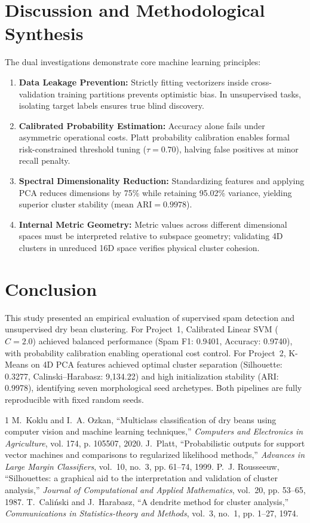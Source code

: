 \documentclass[9.5pt,twocolumn,letterpaper]{article}
\begin{document}
\section{Discussion and Methodological Synthesis}
The dual investigations demonstrate core machine learning principles:
\begin{enumerate}
  \item \textbf{Data Leakage Prevention:} Strictly fitting vectorizers inside cross-validation training partitions prevents optimistic bias. In unsupervised tasks, isolating target labels ensures true blind discovery.
  \item \textbf{Calibrated Probability Estimation:} Accuracy alone fails under asymmetric operational costs. Platt probability calibration enables formal risk-constrained threshold tuning ($\tau=0.70$), halving false positives at minor recall penalty.
  \item \textbf{Spectral Dimensionality Reduction:} Standardizing features and applying PCA reduces dimensions by 75\% while retaining 95.02\% variance, yielding superior cluster stability ($\text{mean ARI}=0.9978$).
  \item \textbf{Internal Metric Geometry:} Metric values across different dimensional spaces must be interpreted relative to subspace geometry; validating 4D clusters in unreduced 16D space verifies physical cluster cohesion.
\end{enumerate}

\section{Conclusion}
This study presented an empirical evaluation of supervised spam detection and unsupervised dry bean clustering. For Project~1, Calibrated Linear SVM ($C=2.0$) achieved balanced performance (Spam F1: 0.9401, Accuracy: 0.9740), with probability calibration enabling operational cost control. For Project~2, K-Means on 4D PCA features achieved optimal cluster separation (Silhouette: 0.3277, Calinski--Harabasz: 9,134.22) and high initialization stability (ARI: 0.9978), identifying seven morphological seed archetypes. Both pipelines are fully reproducible with fixed random seeds.


\begin{thebibliography}{1}
M.~Koklu and I.~A. Ozkan, ``Multiclass classification of dry beans using computer vision and machine learning techniques,'' \emph{Computers and Electronics in Agriculture}, vol. 174, p. 105507, 2020.
J.~Platt, ``Probabilistic outputs for support vector machines and comparisons to regularized likelihood methods,'' \emph{Advances in Large Margin Classifiers}, vol.~10, no.~3, pp. 61--74, 1999.
P.~J. Rousseeuw, ``Silhouettes: a graphical aid to the interpretation and validation of cluster analysis,'' \emph{Journal of Computational and Applied Mathematics}, vol.~20, pp. 53--65, 1987.
T.~Cali{\'n}ski and J.~Harabasz, ``A dendrite method for cluster analysis,'' \emph{Communications in Statistics-theory and Methods}, vol.~3, no.~1, pp. 1--27, 1974.
\end{thebibliography}
\end{document}

